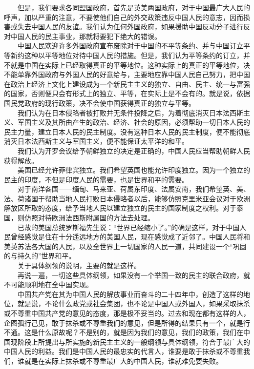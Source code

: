 \documentclass[cn,11pt,chinese]{elegantbook}
\begin{document}
　　但是，我们要求各同盟国政府，首先是英美两国政府，对于中国最广大人民的呼声，加以严重的注意，不要使他们自己的外交政策违反中国人民的意志，因而损害或失去中国人民的友谊。我们认为任何外国政府，如果援助中国反动分子进行反对中国人民的民主事业，那就将要犯下绝大的错误。\\
　　中国人民欢迎许多外国政府宣布废除对于中国的不平等条约、并与中国订立平等新约这种以平等地位对待中国人民的措施。但是，我们认为平等条约的订立，并不就是中国在实际上已经取得真正的平等地位。这种实际上的真正的平等地位，决不能单靠外国政府与外国人民的好意给与，主要地应靠中国人民自己努力，把中国在政治上经济上文化上建设成为一个新民主主义的独立、自由、民主、统一与富强的国家，否则便只会有形式上的独立、平等，在实际上是不会有的。就是说，依据国民党政府的现行政策，决不会使中国获得真正的独立与平等。\\
　　我们认为在日本侵略者被打败并无条件投降之后，为着彻底消灭日本法西斯主义、军国主义及其所由产生的政治、经济、社会的原因，必须帮助一切日本人民的民主力量，建立日本人民的民主制度。没有这种日本人民的民主制度，便不能彻底消灭日本法西斯主义与军国主义，便不能保证太平洋的和平。\\
　　我们认为开罗会议给予朝鲜独立的决定是正确的，中国人民应当帮助朝鲜人民获得解放。\\
　　美国已经允许菲律宾独立。我们希望英国也能允许印度独立。因为一个独立的民主的印度，不但是印度人民的需要，也是世界和平的需要。\\
　　对于南洋各国——缅甸、马来亚、荷属东印度、法属安南，我们希望英、美、法、荷诸国于帮助当地人民打败日本侵略者以后，能够仿照克里米亚会议对于欧洲解放区所取的态度，给予当地人民以建立独立的民主的国家制度之权利。对于泰国，则仿照对待欧洲法西斯附属国的方法去处理。\\
　　已故的美国总统罗斯福先生说：“世界已经缩小了。”的确是这样，对于中国人民曾经感觉是住在十分遥远地方的美国人民，现在感觉成了近邻了。中国人民将和美英苏法各大国的人民，以及全世界上一切国家的人民一道，共同建设一个“巩固的与持久的”世界和平。\\
　　关于具体纲领的说明，主要的就是这样。\\
　　再说一遍，一切这些具体纲领，如果没有一个举国一致的民主的联合政府，就不可能顺利地在全中国实现。\\
　　中国共产党在其为中国人民的解放事业而奋斗的二十四年中，创造了这样的地位，就是说，不论什么政党或社会集团，也不论是中国人或外国人，如果采取抹杀或不尊重中国共产党的意见的态度，那是极不妥当的。过去和现在都有这样的人，企图孤行己见，敢于抹杀或不尊重我们的意见，但是所得的结果只有一个，就是行不通。这是什么原故呢？不是别的，就是因为我们的意见，我们的政策，我们在中国现阶段上所提出与所实施的新民主主义的一般纲领与具体纲领，符合于最广大的中国人民的利益。我们是中国人民的最忠实的代言人，谁要是敢于抹杀或不尊重我们，谁就是在实际上抹杀或不尊重最广大的中国人民，谁就难免要失败。\\
\end{document}

